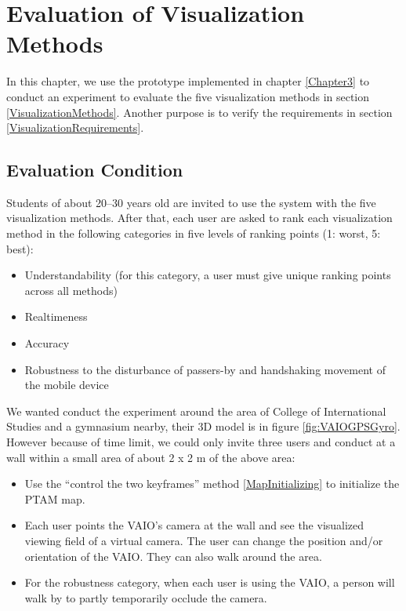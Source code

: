 \chapter{Evaluation of Visualization Methods}
\label{Chapter4}

In this chapter, we use the prototype implemented in chapter \ref{Chapter3} to conduct an experiment to evaluate the five visualization methods in section \ref{VisualizationMethods}. Another purpose is to verify the requirements in section \ref{VisualizationRequirements}.


\section{Evaluation Condition}

Students of about 20--30 years old are invited to use the system with the five visualization methods. After that, each user are asked to rank each visualization method in the following categories in five levels of ranking points (1: worst, 5: best):

\begin{itemize}
	\item Understandability (for this category, a user must give unique ranking points across all methods)
	\item Realtimeness
	\item Accuracy
	\item Robustness to the disturbance of passers-by and handshaking movement of the mobile device
\end{itemize}

We wanted conduct the experiment around the area of College of International Studies and a gymnasium nearby, their 3D model is in figure \ref{fig:VAIOGPSGyro}. However because of time limit, we could only invite three users and conduct at a wall within a small area of about 2 x 2 m of the above area:

\begin{itemize}
	\item Use the ``control the two keyframes'' method \ref{MapInitializing} to initialize the PTAM map.
	\item Each user points the VAIO's camera at the wall and see the visualized viewing field of a virtual camera. The user can change the position and/or orientation of the VAIO. They can also walk around the area.
	\item For the robustness category, when each user is using the VAIO, a person will walk by to partly temporarily occlude the camera.
\end{itemize}

